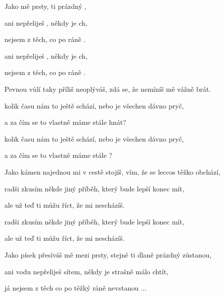 

\zs
Jako   mě  prsty,  ti  prázdný , 

ani  nepřeliješ , někdy je   ch, 

 nejsem z těch, co po  ráně . 

 ani  nepřeliješ , někdy je   ch, 

 nejsem z těch, co po  ráně .  
\ks

\zs
Pevnou vůlí taky příliš neoplýváš, zdá se, že nemíníš mě vážně brát. 

kolik času nám to ještě schází, nebo je všechen dávno pryč, 

a za čím se to vlastně máme stále hnát? 

kolik času nám to ještě schází, nebo je všechen dávno pryč, 

a za čím se to vlastně máme stále ? 
\ks

\zs
Jako kámen najednou mi v cestě stojíš, vím, že se leccos těžko obchází, 

radši zkusím někde jiný příběh, který bude lepší konec mít, 

ale už teď ti můžu říct, že mi nescházíš. 

radši zkusím někde jiný příběh, který bude lepší konec mít, 

ale už teď ti můžu říct, že mi nescházíš. 
\ks

\zs
Jako písek přesíváš mě mezi prsty, stejně ti dlaně prázdný zůstanou, 

ani vodu nepřeliješ sítem, někdy je strašně málo chtít, 

já nejsem z těch co po těžký ráně nevstanou ...
\ks

\kp

